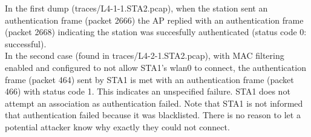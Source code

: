 In the first dump (traces/L4-1-1.STA2.pcap), when the station sent an authentication frame (packet 2666) the AP replied with an authentication frame (packet 2668) indicating the station was succesfully authenticated (status code 0: successful).\\
In the second case (found in traces/L4-2-1.STA2.pcap), with MAC filtering enabled and configured to not allow STA1's wlan0 to connect,
the authentication frame (packet 464) sent by STA1 is met with an authentication frame (packet 466)
with status code 1. This indicates an unspecified failure. STA1 does not attempt an association as authentication failed. Note that STA1 is not informed that authentication failed because it was blacklisted. There is no reason to let a potential attacker know why exactly they could not connect.
